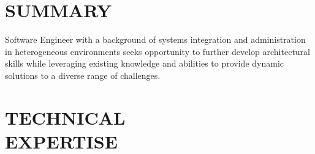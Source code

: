 \documentclass[line,margin]{res}
\begin{document}


 
\begin{resume}
 
\section{SUMMARY}
    Software Engineer with a background of systems integration and
    administration in heterogeneous environments seeks opportunity to
    further develop architectural skills while leveraging existing
    knowledge and abilities to provide dynamic solutions to a diverse
    range of challenges.




\section{TECHNICAL \\ EXPERTISE}


\end{resume}
\end{document}
